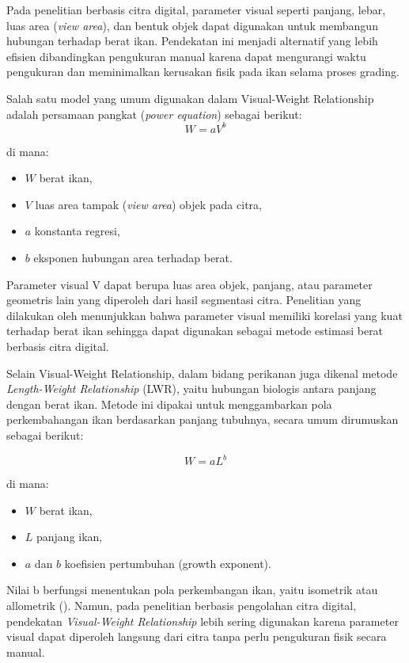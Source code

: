 Pada penelitian berbasis citra digital, parameter visual seperti panjang, lebar, luas area (\emph{view area}), dan bentuk objek dapat digunakan untuk membangun hubungan terhadap berat ikan.
Pendekatan ini menjadi alternatif yang lebih efisien dibandingkan pengukuran manual karena dapat mengurangi waktu pengukuran dan meminimalkan kerusakan fisik pada ikan selama proses grading.

Salah satu model yang umum digunakan dalam Visual-Weight Relationship adalah persamaan pangkat (\emph{power equation}) sebagai berikut:
\begin{equation}
W = aV^b
\label{eq:vwr}
\end{equation}

di mana:
\begin{itemize}
    \item $W$ berat ikan,
    \item $V$ luas area tampak (\textit{view area}) objek pada citra,
    \item $a$ konstanta regresi,
    \item $b$ eksponen hubungan area terhadap berat.
\end{itemize}

Parameter visual V dapat berupa luas area objek, panjang, atau parameter geometris lain yang diperoleh dari hasil segmentasi citra.
Penelitian yang dilakukan oleh \textcite{Balaban2010} menunjukkan bahwa parameter visual memiliki korelasi yang kuat terhadap berat ikan sehingga dapat digunakan sebagai metode estimasi berat berbasis citra digital.

Selain Visual-Weight Relationship, dalam bidang perikanan juga dikenal metode \emph{Length-Weight Relationship} (LWR),
yaitu hubungan biologis antara panjang dengan berat ikan. Metode ini dipakai untuk menggambarkan pola perkembahangan ikan berdasarkan panjang tubuhnya, secara umum dirumuskan sebagai berikut:

\begin{equation}
W = aL^b
\label{eq:lwr}
\end{equation}

di mana:
\begin{itemize}
    \item $W$ berat ikan,
    \item $L$ panjang ikan,
    \item $a$ dan $b$  koefisien pertumbuhan (growth exponent).
\end{itemize}

Nilai b berfungsi menentukan pola perkembangan ikan, yaitu isometrik atau allometrik (\cite{LeCren1951}).
Namun, pada penelitian berbasis pengolahan citra digital, pendekatan \emph{Visual-Weight Relationship} lebih sering digunakan karena parameter visual dapat diperoleh langsung dari citra tanpa perlu pengukuran fisik secara manual.

